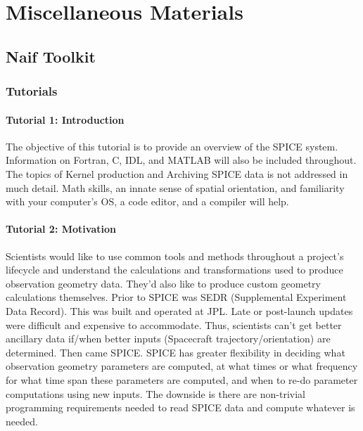 \documentclass[crop=false,class=book]{standalone}
\begin{document}
\chapter{Miscellaneous Materials}
    \section{Naif Toolkit}
        \subsection{Tutorials}
            \subsubsection{Tutorial 1: Introduction}
                The objective of this tutorial is to
                provide an overview of the SPICE system.
                Information on Fortran, C, IDL, and MATLAB
                will also be included throughout.
                The topics of Kernel production and
                Archiving SPICE data is not addressed in
                much detail. Math skills, an innate sense
                of spatial orientation, and familiarity with
                your computer's OS, a code editor,
                and a compiler will help. 
            \subsubsection{Tutorial 2: Motivation}
                Scientists would like to use common tools and
                methods throughout a project's lifecycle and
                understand the calculations and transformations
                used to produce observation geometry data. They'd
                also like to produce custom geometry calculations
                themselves. Prior to SPICE was SEDR
                (Supplemental Experiment Data Record). This was
                built and operated at JPL. Late or post-launch
                updates were difficult and expensive to accommodate.
                Thus, scientists can't get better ancillary data
                if/when better inputs
                (Spacecraft trajectory/orientation) are determined. Then came SPICE. SPICE has greater flexibility in deciding what observation geometry parameters are computed, at what times or what frequency for what time span these parameters are computed, and when to re-do parameter computations using new inputs. The downside is there are non-trivial programming requirements needed to read SPICE data and compute whatever is needed. 
\end{document}
